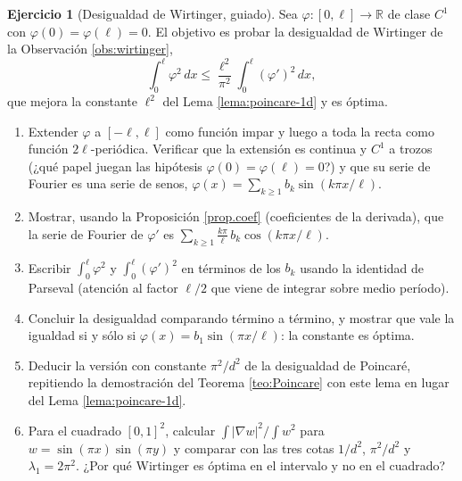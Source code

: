 \documentclass[12pt, a4paper]{amsbook}
\newcommand{\R}{{\mathbb R}}
\theoremstyle{remark}
\theoremstyle{definition}
\newtheorem{ejer}[teo]{Ejercicio}
\numberwithin{section}{chapter}
\numberwithin{subsection}{section}
\numberwithin{equation}{section}
\numberwithin{figure}{chapter}
\begin{document}
\begin{ejer}[Desigualdad de Wirtinger, guiado]\label{ejer:wirtinger}
Sea $\varphi\colon[0,\ell]\to\R$ de clase $C^1$ con $\varphi(0)=\varphi(\ell)=0$. El objetivo es probar la desigualdad de Wirtinger de la Observación \ref{obs:wirtinger},
$$
\int_0^\ell \varphi^2\, dx \le \frac{\ell^2}{\pi^2}\int_0^\ell (\varphi')^2\, dx ,
$$
que mejora la constante $\ell^2$ del Lema \ref{lema:poincare-1d} y es óptima.
\begin{enumerate}
\item Extender $\varphi$ a $[-\ell,\ell]$ como función impar y luego a toda la recta como función $2\ell$-periódica. Verificar que la extensión es continua y $C^1$ a trozos (¿qué papel juegan las hipótesis $\varphi(0)=\varphi(\ell)=0$?) y que su serie de Fourier es una serie de senos, $\varphi(x) = \sum_{k\ge1} b_k\sin(k\pi x/\ell)$.
\item Mostrar, usando la Proposición \ref{prop.coef} (coeficientes de la derivada), que la serie de Fourier de $\varphi'$ es $\sum_{k\ge1} \frac{k\pi}{\ell}\, b_k\cos(k\pi x/\ell)$.
\item Escribir $\int_0^\ell\varphi^2$ y $\int_0^\ell(\varphi')^2$ en términos de los $b_k$ usando la identidad de Parseval (atención al factor $\ell/2$ que viene de integrar sobre medio período).
\item Concluir la desigualdad comparando término a término, y mostrar que vale la igualdad si y sólo si $\varphi(x) = b_1\sin(\pi x/\ell)$: la constante es óptima.
\item Deducir la versión con constante $\pi^2/d^2$ de la desigualdad de Poincaré, repitiendo la demostración del Teorema \ref{teo:Poincare} con este lema en lugar del Lema \ref{lema:poincare-1d}.
\item Para el cuadrado $[0,1]^2$, calcular $\int|\nabla w|^2/\int w^2$ para $w = \sin(\pi x)\sin(\pi y)$ y comparar con las tres cotas $1/d^2$, $\pi^2/d^2$ y $\lambda_1=2\pi^2$. ¿Por qué Wirtinger es óptima en el intervalo y no en el cuadrado?
\end{enumerate}
\end{ejer}


\end{document}
